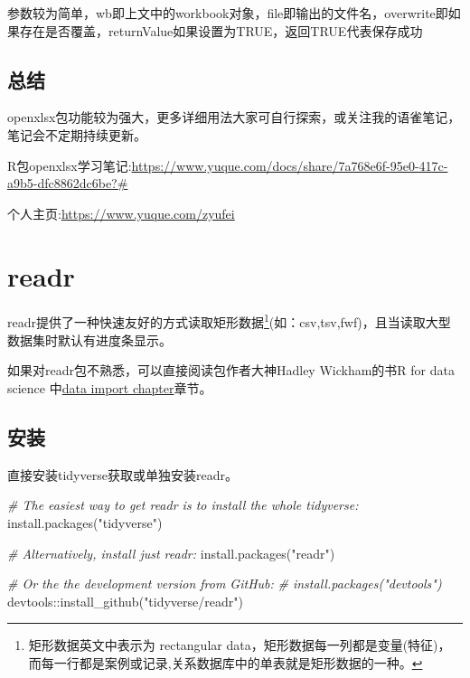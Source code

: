 \documentclass[
]{book}
\newenvironment{Shaded}{\begin{snugshade}}{\end{snugshade}}
\newcommand{\CommentTok}[1]{\textcolor[rgb]{0.56,0.35,0.01}{\textit{#1}}}
\newcommand{\FunctionTok}[1]{\textcolor[rgb]{0.00,0.00,0.00}{#1}}
\newcommand{\NormalTok}[1]{#1}
\newcommand{\SpecialCharTok}[1]{\textcolor[rgb]{0.00,0.00,0.00}{#1}}
\newcommand{\StringTok}[1]{\textcolor[rgb]{0.31,0.60,0.02}{#1}}
\begin{document}
参数较为简单，wb即上文中的workbook对象，file即输出的文件名，overwrite即如果存在是否覆盖，returnValue如果设置为TRUE，返回TRUE代表保存成功

\hypertarget{ux603bux7ed3}{%
\subsection{总结}\label{ux603bux7ed3}}

openxlsx包功能较为强大，更多详细用法大家可自行探索，或关注我的语雀笔记，笔记会不定期持续更新。

R包openxlsx学习笔记:\url{https://www.yuque.com/docs/share/7a768e6f-95e0-417c-a9b5-dfc8862dc6be?\#}

个人主页:\url{https://www.yuque.com/zyufei}

\hypertarget{data:readr}{%
\section{readr}\label{data:readr}}

readr提供了一种快速友好的方式读取矩形数据\footnote{矩形数据英文中表示为 rectangular data，矩形数据每一列都是变量(特征)，而每一行都是案例或记录,关系数据库中的单表就是矩形数据的一种。}(如：csv,tsv,fwf)，且当读取大型数据集时默认有进度条显示。

如果对readr包不熟悉，可以直接阅读包作者大神Hadley Wickham的书R for data science 中\href{https://r4ds.had.co.nz/data-import.html}{data import chapter}章节。

\hypertarget{ux5b89ux88c5-2}{%
\subsection{安装}\label{ux5b89ux88c5-2}}

直接安装tidyverse获取或单独安装readr。

\begin{Shaded}
\begin{Highlighting}[]
\CommentTok{\# The easiest way to get readr is to install the whole tidyverse:}
\FunctionTok{install.packages}\NormalTok{(}\StringTok{"tidyverse"}\NormalTok{)}

\CommentTok{\# Alternatively, install just readr:}
\FunctionTok{install.packages}\NormalTok{(}\StringTok{"readr"}\NormalTok{)}

\CommentTok{\# Or the the development version from GitHub:}
\CommentTok{\# install.packages("devtools")}
\NormalTok{devtools}\SpecialCharTok{::}\FunctionTok{install\_github}\NormalTok{(}\StringTok{"tidyverse/readr"}\NormalTok{)}
\end{Highlighting}
\end{Shaded}
\end{document}
